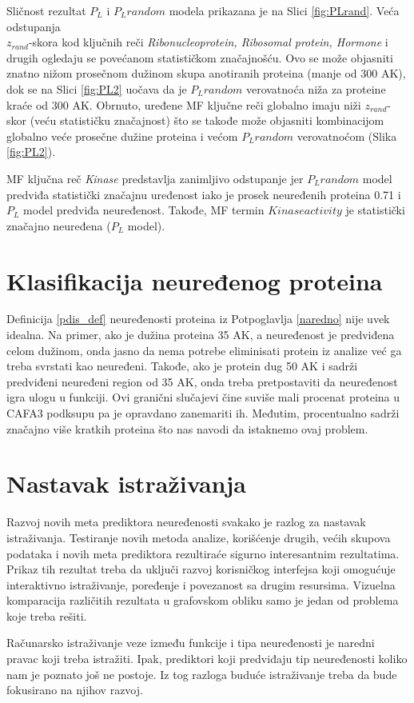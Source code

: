 Sličnost rezultat $P_L$ i $P_L random$ modela prikazana je na Slici
\ref{fig:PLrand}. Veća odstupanja \\$z_{rand}$-skora kod ključnih reči
\textit{Ribonucleoprotein, Ribosomal protein, Hormone} i drugih ogledaju se
povećanom statističkom značajnošću. Ovo se može objasniti znatno
nižom prosečnom dužinom skupa anotiranih proteina (manje od 300 AK), dok se na
Slici \ref{fig:PL2} uočava da je $P_L random$ verovatnoća niža za proteine
kraće od 300 AK.  Obrnuto, uređene MF ključne reči globalno imaju niži
$z_{rand}$-skor (veću statističku značajnost) što se takođe može objasniti
kombinacijom globalno veće prosečne dužine proteina i većom $P_L random$
verovatnoćom (Slika \ref{fig:PL2}). 

MF ključna reč \textit{Kinase} predstavlja zanimljivo odstupanje jer $P_L
random$ model predviđa statistički značajnu uređenost iako je prosek neuređenih
proteina 0.71 i $P_L$ model predviđa neuređenost. Takođe, MF termin $Kinase
activity$ je statistički značajno neuređena ($P_L$ model).

\section{Klasifikacija neuređenog proteina}

Definicija \ref{pdis_def} neuređenosti proteina iz Potpoglavlja
\ref{naredno} nije uvek idealna.  Na primer, ako je dužina proteina 35 AK, a
neuređenost je predviđena celom dužinom, onda jasno da nema potrebe eliminisati
protein iz analize već ga treba svrstati kao neuređeni.  Takođe, ako je protein
dug 50 AK i sadrži predviđeni neuređeni region od 35 AK, onda treba
pretpostaviti da neuređenost igra ulogu u funkciji. Ovi granični slučajevi čine
suviše mali procenat proteina u CAFA3 podksupu pa je opravdano zanemariti ih.
Međutim, procentualno \swissprot sadrži značajno više kratkih proteina što nas
navodi da istaknemo ovaj problem.

\section{Nastavak istraživanja}

Razvoj novih meta prediktora neuređenosti \cite{mengc2017} svakako je razlog za
nastavak istraživanja. Testiranje novih metoda analize, korišćenje drugih,
većih skupova podataka i novih meta prediktora rezultiraće sigurno interesantnim
rezultatima. Prikaz tih rezultat treba da uključi razvoj korisničkog interfejsa
koji omogućuje interaktivno istraživanje, poređenje i povezanost sa drugim
resursima. Vizuelna komparacija različitih rezultata u grafovskom obliku samo
je jedan od problema koje treba rešiti.

Računarsko istraživanje veze između funkcije i tipa neuređenosti je naredni
pravac koji treba istražiti. Ipak, prediktori koji predviđaju tip neuređenosti
koliko nam je poznato još ne postoje. Iz tog razloga buduće istraživanje treba
da bude fokusirano na njihov razvoj.

